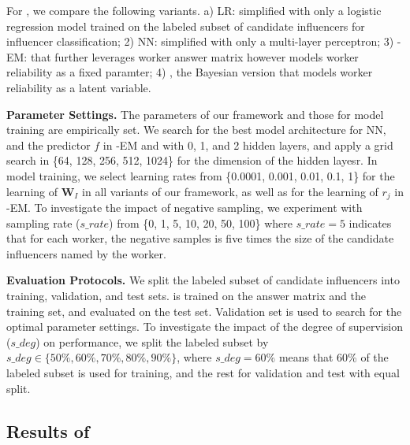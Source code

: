 For \sys, we compare the following variants. a) LR: simplified \sys with only a logistic regression model trained on the labeled subset of candidate influencers for influencer classification; 2) NN: simplified \sys with only a multi-layer perceptron; 3) \sys-EM: \sys that further leverages worker answer matrix however models worker reliability as a fixed paramter; 4) \sys, the Bayesian version that models worker reliability as a latent variable.

\smallskip
\noindent\textbf{Parameter Settings.} The parameters of our framework and those for model training are empirically set. We search for the best model architecture for NN, and the predictor $f$ in \sys-EM and \sys with 0, 1, and 2 hidden layers, and apply a grid search in \{64, 128, 256, 512, 1024\} for the dimension of the hidden layesr. In model training, we select learning rates from \{0.0001, 0.001, 0.01, 0.1, 1\} for the learning of $\mathbf{W}_I$ in all variants of our framework, as well as for the learning of $r_j$ in \sys-EM. To investigate the impact of negative sampling, we experiment with sampling rate ($s\_rate$) from \{0, 1, 5, 10, 20, 50, 100\} where $s\_rate=5$ indicates that for each worker, the negative samples is five times the size of the candidate influencers named by the worker. 

\smallskip
\noindent\textbf{Evaluation Protocols.} We split the labeled subset of candidate influencers into training, validation, and test sets. \sys is trained on the answer matrix and the training set, and evaluated on the test set. Validation set is used to search for the optimal parameter settings. To investigate the impact of the degree of supervision ($s\_deg$) on \sys performance, we split the labeled subset by $s\_deg\in \{50\%, 60\%, 70\%, 80\%, 90\%\}$, where $s\_deg = 60\%$ means that 60\% of the labeled subset is used for training, and the rest for validation and test with equal split.



\subsection{Results of \sys}
\label{sec:selfres}

